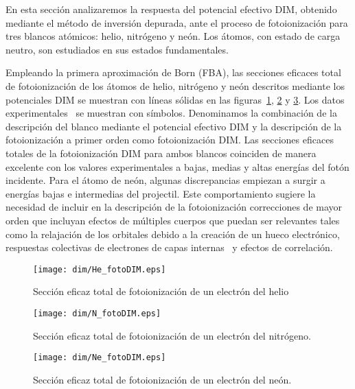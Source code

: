 En esta sección analizaremos la respuesta del potencial efectivo DIM, 
obtenido mediante el método de inversión depurada, ante el proceso de
fotoionización para tres blancos atómicos: helio, nitrógeno y neón. 
Los átomos, con estado de carga neutro, son estudiados en sus estados
fundamentales.

Empleando la primera aproximación de Born (FBA), las secciones eficaces
total de fotoionización de los átomos de helio, nitrógeno y neón descritos 
mediante los potenciales DIM se muestran con líneas sólidas en las 
figuras~\ref{fig:HephotoDIM}, \ref{fig:NphotoDIM} y \ref{fig:NephotoDIM}.
Los datos experimentales~\cite{Henke:93,Samson:90,Samson:02,Stolte:16} 
se muestran con símbolos. Denominamos la combinación de la 
descripción del blanco mediante el potencial efectivo DIM y la descripción 
de la fotoionización a primer orden como fotoionización DIM. 
Las secciones eficaces totales de la fotoionización DIM para ambos 
blancos coinciden de manera excelente con los valores experimentales
a bajas, medias y altas energías del fotón incidente. Para el átomo de
neón, algunas discrepancias empiezan a surgir a energías bajas e 
intermedias del projectil. Este comportamiento sugiere la necesidad de 
incluir en la descripción de la fotoionización correcciones de mayor 
orden que incluyan efectos de múltiples cuerpos que puedan ser 
relevantes tales como la relajación de los orbitales debido a la 
creación de un hueco electrónico, respuestas colectivas de electrones 
de capas internas~\cite{Ederer:64} y efectos de correlación.

\begin{figure}[H]
\centering
 \texttt{[image: dim/He\_fotoDIM.eps]}
\caption[Fotoionización de helio.]
{Sección eficaz total de fotoionización de un electrón del helio}
\label{fig:HephotoDIM}
\end{figure}
\begin{figure}[H]
\centering
 \texttt{[image: dim/N\_fotoDIM.eps]}
\caption[Fotoionización de nitrógeno.]
{Sección eficaz total de fotoionización de un electrón del 
nitrógeno.}
\label{fig:NphotoDIM}
\end{figure}
\begin{figure}[H]
\centering
 \texttt{[image: dim/Ne\_fotoDIM.eps]}
\caption[Fotoionización de neón.]
{Sección eficaz total de fotoionización de un electrón del neón.}
\label{fig:NephotoDIM}
\end{figure}

